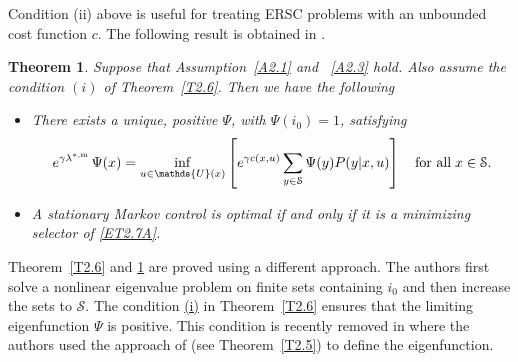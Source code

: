 \documentclass[notitlepage,11pt,reqno]{amsart}
\numberwithin{equation}{section}
\theoremstyle{plain}
\newtheorem{theorem}{Theorem}[section]
\theoremstyle{definition}
\theoremstyle{remark}
\newcommand{\Act}{{\mathds{U}}}
\newcommand{\cS}{{\mathcal{S}}}     %
\newcommand{\lamstrdm}{\lambda^{*,{\rm m}}}
\begin{document}
Condition (ii) above is useful for treating ERSC problems with an unbounded 
cost function $c$. The following result is obtained in \cite{MR4429406}.
\begin{theorem}\label{T2.7}
Suppose that Assumption~\ref{A2.1} and ~\ref{A2.3} hold. Also assume the condition $(i)$ of Theorem~\ref{T2.6}. Then we have the following
\begin{itemize}
\item[(i)] There exists a unique, positive $\Psi$, with $\Psi(i_0)=1$,
satisfying
\begin{equation}\label{ET2.7A}
e^{\gamma\lamstrdm}\, \Psi(x)= \inf_{u\in\Act(x)} \left[e^{\gamma c(x, u)} \sum_{y\in\cS} \Psi(y) P(y|x, u)\right]\quad \text{for all}\; x\in \cS.
\end{equation}
\item[(ii)] A stationary Markov control is optimal if and only if it is a
minimizing selector of \eqref{ET2.7A}.
\end{itemize}
\end{theorem}
Theorem~\ref{T2.6} and \ref{T2.7} are proved using a different approach. 
The authors first solve a nonlinear eigenvalue problem on finite sets
containing $i_0$ and then increase the sets to $\cS$. The condition
\hyperlink{i}{(i)} in Theorem~\ref{T2.6} ensures that the limiting eigenfunction $\Psi$ is positive. This condition is recently removed 
in \cite{Wei-Chen} where the authors used the approach of \cite{MR1886226}
(see Theorem~\ref{T2.5})
to define the eigenfunction.
\end{document}
